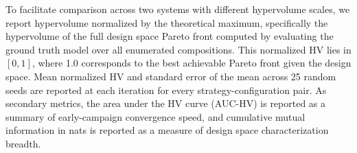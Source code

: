 To facilitate comparison across two systems with different hypervolume scales, we report hypervolume normalized by the theoretical maximum, specifically the hypervolume of the full design space Pareto front computed by evaluating the ground truth model over all enumerated compositions. This normalized HV lies in $[0, 1]$, where 1.0 corresponds to the best achievable Pareto front given the design space. Mean normalized HV and standard error of the mean across 25 random seeds are reported at each iteration for every strategy-configuration pair. As secondary metrics, the area under the HV curve (AUC-HV) is reported as a summary of early-campaign convergence speed, and cumulative mutual information in nats is reported as a measure of design space characterization breadth.
